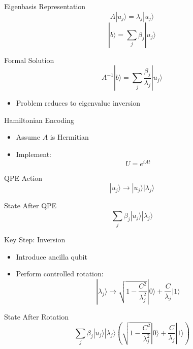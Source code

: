 \documentclass{beamer}
\begin{document}
\begin{frame}{Eigenbasis Representation}
\[
A |u_j\rangle = \lambda_j |u_j\rangle
\]
\[
|b\rangle = \sum_j \beta_j |u_j\rangle
\]
\end{frame}


\begin{frame}{Formal Solution}
\[
A^{-1}|b\rangle = \sum_j \frac{\beta_j}{\lambda_j} |u_j\rangle
\]
\begin{itemize}
\item Problem reduces to eigenvalue inversion
\end{itemize}
\end{frame}



\begin{frame}{Hamiltonian Encoding}
\begin{itemize}
\item Assume $A$ is Hermitian
\item Implement:
\[
U = e^{iAt}
\]
\end{itemize}
\end{frame}


\begin{frame}{QPE Action}
\[
|u_j\rangle \rightarrow |u_j\rangle |\lambda_j\rangle
\]
\end{frame}


\begin{frame}{State After QPE}
\[
\sum_j \beta_j |u_j\rangle |\lambda_j\rangle
\]
\end{frame}


\begin{frame}{Key Step: Inversion}
\begin{itemize}
\item Introduce ancilla qubit
\item Perform controlled rotation:
\[
|\lambda_j\rangle \rightarrow
\sqrt{1-\frac{C^2}{\lambda_j^2}}|0\rangle +
\frac{C}{\lambda_j}|1\rangle
\]
\end{itemize}
\end{frame}


\begin{frame}{State After Rotation}
\[
\sum_j \beta_j |u_j\rangle |\lambda_j\rangle
\left(
\sqrt{1-\frac{C^2}{\lambda_j^2}}|0\rangle +
\frac{C}{\lambda_j}|1\rangle
\right)
\]
\end{frame}
\end{document}
